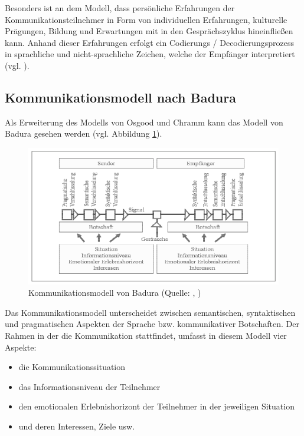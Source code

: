 Besonders ist an dem Modell, dass persönliche Erfahrungen der Kommunikationsteilnehmer in Form von individuellen Erfahrungen, kulturelle Prägungen, Bildung und Erwartungen mit in den Gesprächszyklus hineinfließen kann. Anhand dieser Erfahrungen erfolgt ein Codierungs / Decodierungsprozess in sprachliche und nicht-sprachliche Zeichen, welche der Empfänger interpretiert (vgl. \cite{noauthor_osgood_2024}). 

\subsection{Kommunikationsmodell nach Badura}
Als Erweiterung des Modells von Osgood und Chramm kann das Modell von Badura gesehen werden (vgl. Abbildung \ref{fig:badura-modell}).

\begin{figure}[ht]
\centering
\includegraphics[width=1\linewidth]{content/pictures/badura.PNG}
\caption{Kommunikationsmodell von Badura (Quelle: \cite{badura_kommunikation_1992}, \cite[S. 93]{scheufele_kommunikation_2007})}
\label{fig:badura-modell}
\end{figure}

Das Kommunikationsmodell unterscheidet zwischen semantischen, syntaktischen und pragmatischen Aspekten der Sprache bzw. kommunikativer Botschaften. Der Rahmen in der die Kommunikation stattfindet, umfasst in diesem Modell vier Aspekte:

\begin{itemize}
    \item die Kommunikationssituation
    \item das Informationsniveau der Teilnehmer
    \item den emotionalen Erlebnishorizont der Teilnehmer in der jeweiligen Situation 
    \item und deren Interessen, Ziele usw.
\end{itemize}

